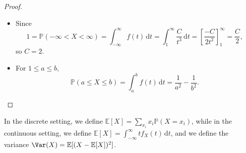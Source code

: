\begin{proof}
\hfill
    \begin{itemize}
        \item [(a)] Since 
        \[
            1 = \mathbb{P} (-\infty < X < \infty) = \int _{-\infty }^{\infty } f(t) \, \mathrm{d} t = \int _1^{\infty} \frac{C}{t^3} \, \mathrm{d} t = \left[ \frac{-C}{2t^2} \right]_1^{\infty} = \frac{C}{2},  
        \]
        so \(C = 2\). 
        \item [(b)] For \(1 \le a \le b\), 
        \[
            \mathbb{P} (a \le X \le b) = \int _a^b f(t) \, \mathrm{d} t = \frac{1}{a^2} - \frac{1}{b^2}. 
        \]
    \end{itemize}
\end{proof}

\begin{definition}
    In the discrete setting, we define \(\mathbb{E} [X] = \sum_{x_i} x_i \mathbb{P} (X = x_i) \), while in the continuous setting, we define \(\mathbb{E} [X] = \int _{-\infty }^{\infty} t f_X(t) \, \mathrm{d} t \), and we define the variance \(\Var(X) = \mathbb{E} [(X - \mathbb{E} [X])^2]\). 
\end{definition}

